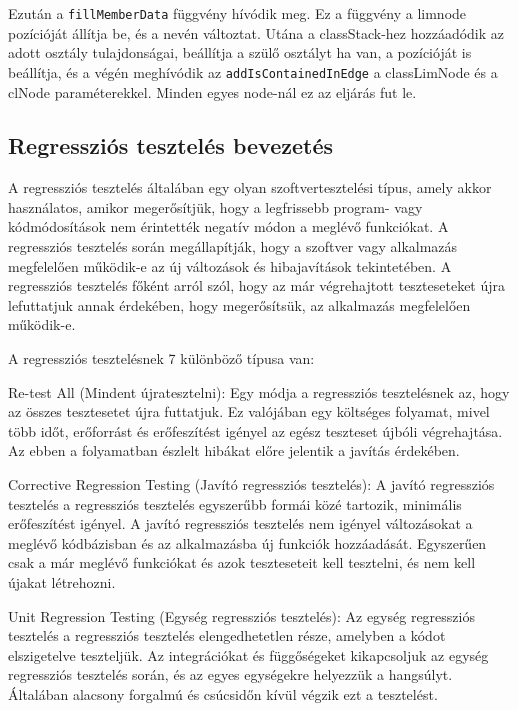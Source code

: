 Ezután a \texttt{fillMemberData} függvény hívódik meg.
Ez a függvény a limnode pozícióját állítja be, és a nevén változtat.
Utána a classStack-hez hozzáadódik az adott osztály tulajdonságai, beállítja a szülő osztályt ha van, a pozícióját is beállítja, és a végén meghívódik az \texttt{addIsContainedInEdge} a classLimNode és a clNode paraméterekkel.
Minden egyes node-nál ez az eljárás fut le.

\subsection{Regressziós tesztelés bevezetés}

\noindent


A regressziós tesztelés általában egy olyan szoftvertesztelési típus, amely akkor használatos, amikor megerősítjük, hogy a legfrissebb program- vagy kódmódosítások nem érintették negatív módon a meglévő funkciókat.
A regressziós tesztelés során megállapítják, hogy a szoftver vagy alkalmazás megfelelően működik-e az új változások és hibajavítások tekintetében.
A regressziós tesztelés főként arról szól, hogy az már végrehajtott teszteseteket újra lefuttatjuk annak érdekében, hogy megerősítsük, az alkalmazás megfelelően működik-e.

A regressziós tesztelésnek 7 különböző típusa van:

\noindent

Re-test All (Mindent újratesztelni): Egy módja a regressziós tesztelésnek az, hogy az összes tesztesetet újra futtatjuk.
Ez valójában egy költséges folyamat, mivel több időt, erőforrást és erőfeszítést igényel az egész teszteset újbóli végrehajtása.
Az ebben a folyamatban észlelt hibákat előre jelentik a javítás érdekében.

\noindent

Corrective Regression Testing (Javító regressziós tesztelés):
A javító regressziós tesztelés a regressziós tesztelés egyszerűbb formái közé tartozik, minimális erőfeszítést igényel.
A javító regressziós tesztelés nem igényel változásokat a meglévő kódbázisban és az alkalmazásba új funkciók hozzáadását.
Egyszerűen csak a már meglévő funkciókat és azok teszteseteit kell tesztelni, és nem kell újakat létrehozni.

\noindent

Unit Regression Testing (Egység regressziós tesztelés):
Az egység regressziós tesztelés a regressziós tesztelés elengedhetetlen része, amelyben a kódot elszigetelve teszteljük.
Az integrációkat és függőségeket kikapcsoljuk az egység regressziós tesztelés során, és az egyes egységekre helyezzük a hangsúlyt.
Általában alacsony forgalmú és csúcsidőn kívül végzik ezt a tesztelést.

